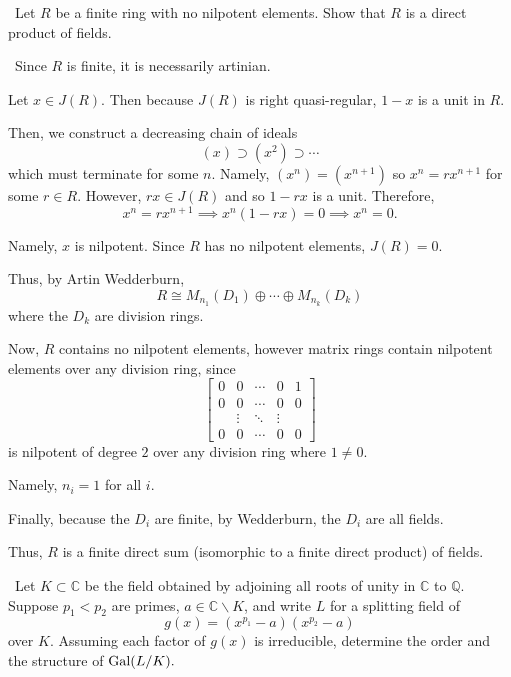 \documentclass[12pt]{AlgebraQual}
\begin{document}
\begin{problem} $\,$
Let $R$ be a finite ring with no nilpotent elements. Show that $R$ is a direct product of fields.
\end{problem}


\begin{solution}$\,$
Since $R$ is finite, it is necessarily artinian.

Let $x\in J(R)$. Then because $J(R)$ is right quasi-regular, $1-x$ is a unit in $R$.

Then, we construct a decreasing chain of ideals $$(x)\supset (x^2)\supset\cdots$$ which must terminate for some $n$. Namely, $(x^n)=(x^{n+1})$ so $x^n=rx^{n+1}$ for some $r\in R$. However, $rx\in J(R)$ and so $1-rx$ is a unit. Therefore, $$x^n=rx^{n+1}\implies x^n(1-rx)=0\implies x^n=0.$$

Namely, $x$ is nilpotent. Since $R$ has no nilpotent elements, $J(R)=0.$

Thus, by Artin Wedderburn, $$R\cong M_{n_1}(D_1)\oplus\cdots\oplus M_{n_k}(D_k)$$ where the $D_k$ are division rings.

Now, $R$ contains no nilpotent elements, however matrix rings contain nilpotent elements over any division ring, since $$\begin{bmatrix}
0 & 0 &\cdots & 0 & 1\\
0 & 0 &\cdots & 0 & 0\\
& \vdots &\ddots & \vdots &\\
0 & 0 &\cdots & 0 & 0
\end{bmatrix}$$ is nilpotent of degree $2$ over any division ring where $1\not=0$.

Namely, $n_i=1$ for all $i$.

Finally, because the $D_i$ are finite, by Wedderburn, the $D_i$ are all fields.

Thus, $R$ is a finite direct sum (isomorphic to a finite direct product) of fields.
\end{solution}
\newpage



\begin{problem} $\,$
Let $K\subset\mathbb{C}$ be the field obtained by adjoining all roots of unity in $\mathbb{C}$ to $\mathbb{Q}$. Suppose $p_1<p_2$ are primes, $a\in\mathbb{C}\backslash K$, and write $L$ for a splitting field of $$g(x)=(x^{p_1}-a)(x^{p_2}-a)$$ over $K.$ Assuming each factor of $g(x)$ is irreducible, determine the order and the structure of $\text{Gal}(L/K).$
\end{problem}
\end{document}
